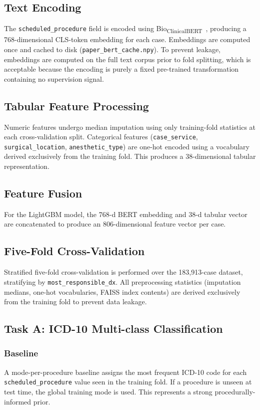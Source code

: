 \documentclass[10pt,twocolumn]{article}
\begin{document}
\subsection{Text Encoding}
\label{sec:bert}
The \texttt{scheduled\_procedure} field is encoded using Bio\textsubscript{ClinicalBERT}~\cite{alsentzer2019publicly}, producing a 768-dimensional CLS-token embedding for each case. Embeddings are computed once and cached to disk (\texttt{paper\_bert\_cache.npy}). To prevent leakage, embeddings are computed on the full text corpus prior to fold splitting, which is acceptable because the encoding is purely a fixed pre-trained transformation containing no supervision signal.

\subsection{Tabular Feature Processing}
Numeric features undergo median imputation using only training-fold statistics at each cross-validation split. Categorical features (\texttt{case\_service}, \texttt{surgical\_location}, \texttt{anesthetic\_type}) are one-hot encoded using a vocabulary derived exclusively from the training fold. This produces a 38-dimensional tabular representation.

\subsection{Feature Fusion}
For the LightGBM model, the 768-d BERT embedding and 38-d tabular vector are concatenated to produce an 806-dimensional feature vector per case.

\subsection{Five-Fold Cross-Validation}
Stratified five-fold cross-validation is performed over the 183,913-case dataset, stratifying by \texttt{most\_responsible\_dx}. All preprocessing statistics (imputation medians, one-hot vocabularies, FAISS index contents) are derived exclusively from the training fold to prevent data leakage.

\subsection{Task A: ICD-10 Multi-class Classification}
\label{sec:taska}

\subsubsection{Baseline}
A mode-per-procedure baseline assigns the most frequent ICD-10 code for each \texttt{scheduled\_procedure} value seen in the training fold. If a procedure is unseen at test time, the global training mode is used. This represents a strong procedurally-informed prior.
\end{document}
